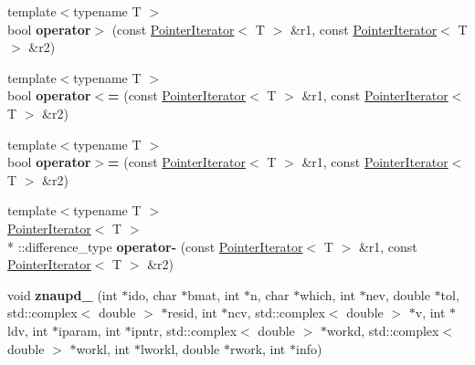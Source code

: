 \begin{DoxyCompactItemize}
\item 
\hypertarget{namespacekeycpp_a7330eaaa701d2308c19f84adda097685}{{\footnotesize template$<$typename T $>$ }\\bool {\bfseries operator$>$} (const \hyperlink{classkeycpp_1_1_pointer_iterator}{Pointer\-Iterator}$<$ T $>$ \&r1, const \hyperlink{classkeycpp_1_1_pointer_iterator}{Pointer\-Iterator}$<$ T $>$ \&r2)}\label{namespacekeycpp_a7330eaaa701d2308c19f84adda097685}

\item 
\hypertarget{namespacekeycpp_a9b02f40e92cad47b419ac09207518b9f}{{\footnotesize template$<$typename T $>$ }\\bool {\bfseries operator$<$=} (const \hyperlink{classkeycpp_1_1_pointer_iterator}{Pointer\-Iterator}$<$ T $>$ \&r1, const \hyperlink{classkeycpp_1_1_pointer_iterator}{Pointer\-Iterator}$<$ T $>$ \&r2)}\label{namespacekeycpp_a9b02f40e92cad47b419ac09207518b9f}

\item 
\hypertarget{namespacekeycpp_af6e928cddf953cbdd90b0cd6f3802b24}{{\footnotesize template$<$typename T $>$ }\\bool {\bfseries operator$>$=} (const \hyperlink{classkeycpp_1_1_pointer_iterator}{Pointer\-Iterator}$<$ T $>$ \&r1, const \hyperlink{classkeycpp_1_1_pointer_iterator}{Pointer\-Iterator}$<$ T $>$ \&r2)}\label{namespacekeycpp_af6e928cddf953cbdd90b0cd6f3802b24}

\item 
\hypertarget{namespacekeycpp_ad88546738baf0a658bbe540827343939}{{\footnotesize template$<$typename T $>$ }\\\hyperlink{classkeycpp_1_1_pointer_iterator}{Pointer\-Iterator}$<$ T $>$\\*
\-::difference\-\_\-type {\bfseries operator-\/} (const \hyperlink{classkeycpp_1_1_pointer_iterator}{Pointer\-Iterator}$<$ T $>$ \&r1, const \hyperlink{classkeycpp_1_1_pointer_iterator}{Pointer\-Iterator}$<$ T $>$ \&r2)}\label{namespacekeycpp_ad88546738baf0a658bbe540827343939}

\item 
\hypertarget{namespacekeycpp_a9f7b4d3036445526caa713d8c224a9a3}{void {\bfseries znaupd\-\_\-} (int $\ast$ido, char $\ast$bmat, int $\ast$n, char $\ast$which, int $\ast$nev, double $\ast$tol, std\-::complex$<$ double $>$ $\ast$resid, int $\ast$ncv, std\-::complex$<$ double $>$ $\ast$v, int $\ast$ldv, int $\ast$iparam, int $\ast$ipntr, std\-::complex$<$ double $>$ $\ast$workd, std\-::complex$<$ double $>$ $\ast$workl, int $\ast$lworkl, double $\ast$rwork, int $\ast$info)}\label{namespacekeycpp_a9f7b4d3036445526caa713d8c224a9a3}


\end{DoxyCompactItemize}
